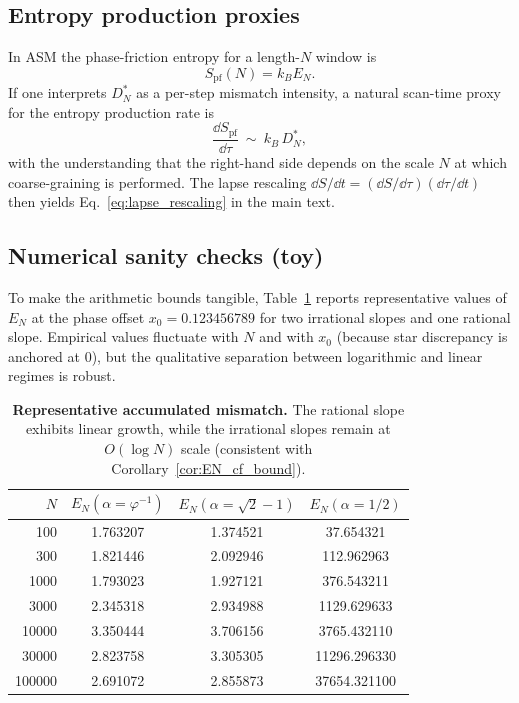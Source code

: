\subsection{Entropy production proxies}

In ASM the phase-friction entropy for a length-$N$ window is
\begin{equation}
S_{\mathrm{pf}}(N)=k_B E_N.
\end{equation}
If one interprets $D_N^\ast$ as a per-step mismatch intensity, a natural scan-time proxy for the entropy production rate is
\begin{equation}
\frac{\dd S_{\mathrm{pf}}}{\dd \tau}\ \sim\ k_B\, D_N^\ast,
\end{equation}
with the understanding that the right-hand side depends on the scale $N$ at which coarse-graining is performed. The lapse rescaling $\dd S/\dd t = (\dd S/\dd\tau)(\dd\tau/\dd t)$ then yields Eq.~\eqref{eq:lapse_rescaling} in the main text.

\subsection{Numerical sanity checks (toy)}

To make the arithmetic bounds tangible, Table~\ref{tab:hpt_EN} reports representative values of $E_N$ at the phase offset $x_0=0.123456789$ for two irrational slopes and one rational slope.
Empirical values fluctuate with $N$ and with $x_0$ (because star discrepancy is anchored at $0$), but the qualitative separation between logarithmic and linear regimes is robust.

\begin{table}[t]
\centering
\begin{tabular}{@{}rccc@{}}
\toprule
$N$ & $E_N(\alpha=\varphi^{-1})$ & $E_N(\alpha=\sqrt2-1)$ & $E_N(\alpha=1/2)$ \\
\midrule
100    & 1.763207 & 1.374521 & 37.654321 \\
300    & 1.821446 & 2.092946 & 112.962963 \\
1000   & 1.793023 & 1.927121 & 376.543211 \\
3000   & 2.345318 & 2.934988 & 1129.629633 \\
10000  & 3.350444 & 3.706156 & 3765.432110 \\
30000  & 2.823758 & 3.305305 & 11296.296330 \\
100000 & 2.691072 & 2.855873 & 37654.321100 \\
\bottomrule
\end{tabular}
\caption{\textbf{Representative accumulated mismatch.} The rational slope exhibits linear growth, while the irrational slopes remain at $O(\log N)$ scale (consistent with Corollary~\ref{cor:EN_cf_bound}).}
\label{tab:hpt_EN}
\end{table}

